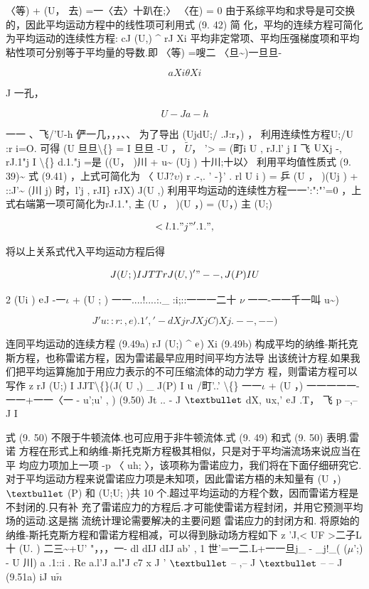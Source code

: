 〈等) + (U， 去) =一〈去〉十趴在;〉 〈在) = 0 由于系综平均和求导是可交换的，因此平均运动方程中的线性项可利用式 (9. 42) 简 化，平均的连续方程可简化为平均运动的连续性方程: cJ (U,) \textasciicircum{} rJ Xi 平均非定常项、平均压强梯度项和平均粘性项可分别等于平均量的导数.即 〈等) =嗖二 〈旦\textasciitilde{})一旦旦-

\[aXi \theta  Xi\]

J 一孔，

\[U-J a-h\]

一一 、飞/'U-h 俨一几，，，、、 为了导出 (UjdU;/ .J:r，) ， 利用连续性方程U;/${\rm U}$ :r i=O. 可得 (U 旦旦\textbackslash\{\} = I 旦旦 -U ， $\tilde{U}$， '> = (町i U , rJ.l' j I 飞 ${\rm U}$Xj -, rJ.1"j I \textbackslash\{\} d.1."j =是 ((U， )川 + u\textasciitilde{} (Uj ) 十川;十以〉 利用平均值性质式 (9. 39)\textasciitilde{} 式 (9.41) ，上式可简化为 〈 UJ?$\upsilon$) r .-,. ' -\}' . rl U i ) = 乒 (U ， )(Uj ) + ::J'\textasciitilde{} (川 j) 时，l'j , rJI\} rJX) J(U ,) 利用平均运动的连续性方程一一':":"'=0 ，上式右端第一项可简化为rJ.1.", 主 (U ， )(U ，) = (U，) 主 (U;)

\[<l.1."j "'.1.",\]

将以上关系式代入平均运动方程后得

\[J(U;) I JTT   rJ (U ,) '"-- ,J( P) I U\]

2 (Ui ) ${\rm e}$J -一$\iota$ + (U ; ) 一一....!....:.\_ :i;::一一一二十 $\nu$ 一一-一一千一叫 u\textasciitilde{})

\[J' u::r:, e).1',' - dXj rJ Xj C) Xj . -- ,--)\]

连同平均运动的连续方程 (9.49a) rJ (U;) \textasciicircum{} ${\rm e}$) Xi (9.49b) 构成平均的纳维-斯托克斯方程，也称雷诺方程，因为雷诺最早应用时间平均方法导 出该统计方程.如果我们把平均运算施加于用应力表示的不可压缩流体的动力学方 程，则雷诺方程可以写作 z rJ (U;) I JJT\textbackslash\{\}(J( U ,) \_ J(P) I ${\rm u}$ /町'..' \textbackslash\{\} 一一$\iota$ + (U ，) 一一一一一-一一+一一〈一 - u';u' , ) (9.50) Jt .. - J ${\rm •}$ dX, ${\rm u}$x,' ${\rm e}$J .T， 飞 p --,-- J I

式 (9. 50) 不限于牛顿流体.也可应用于非牛顿流体.式 (9. 49) 和式 (9. 50) 表明.雷诺 方程在形式上和纳维-斯托克斯方程极其相似，只是对于平均湍流场来说应当在平 均应力项加上一项 -p 〈 uh; 〉，该项称为雷诺应力，我们将在下面仔细研究它. 对于平均运动方程来说雷诺应力项是未知项，因此雷诺方梧的未知量有 (U ，) ${\rm •}$ (P) 和 (U;U; )共 10 个.超过平均运动的方程个数，因而雷诺方程是不封闭的.只有补 充了雷诺应力的方程后.才可能使雷诺方程封闭，并用它预测平均场的运动.这是揣 流统计理论需要解决的主要问题 雷诺应力的封闭方和. 将原始的纳维-斯托克斯方程和雷诺方程相减，可以得到脉动场方程如下 z 'J,< UF >二子L 十 (U. ) 二三\textasciitilde{}+U' "，，，一- dl dIJ dIJ ab' , 1 世'=一二.L+一一旦j\_ - \_j!\_( ($\mu$';) - U 川) a .1::i . Re a.l'J a.l"J c7 x J ' ${\rm •}$ -- ,-- J ${\rm •}$ -- -- J (9.51a) iJ u$\tilde{n}$

